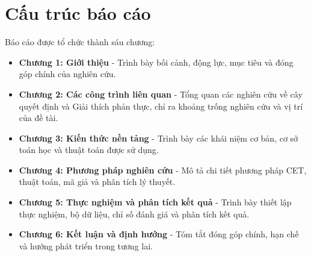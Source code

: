 \section{Cấu trúc báo cáo}
Báo cáo được tổ chức thành sáu chương:

\begin{itemize}[label={}]
\item \textbf{Chương 1: Giới thiệu} - Trình bày bối cảnh, động lực, mục tiêu và đóng góp chính của nghiên cứu.
\item \textbf{Chương 2: Các công trình liên quan} - Tổng quan các nghiên cứu về cây quyết định và Giải thích phản thực, chỉ ra khoảng trống nghiên cứu và vị trí của đề tài.
\item \textbf{Chương 3: Kiến thức nền tảng} - Trình bày các khái niệm cơ bản, cơ sở toán học và thuật toán được sử dụng.
\item \textbf{Chương 4: Phương pháp nghiên cứu} - Mô tả chi tiết phương pháp CET, thuật toán, mã giả và phân tích lý thuyết.
\item \textbf{Chương 5: Thực nghiệm và phân tích kết quả} - Trình bày thiết lập thực nghiệm, bộ dữ liệu, chỉ số đánh giá và phân tích kết quả.
\item \textbf{Chương 6: Kết luận và định hướng} - Tóm tắt đóng góp chính, hạn chế và hướng phát triển trong tương lai.
\end{itemize}
